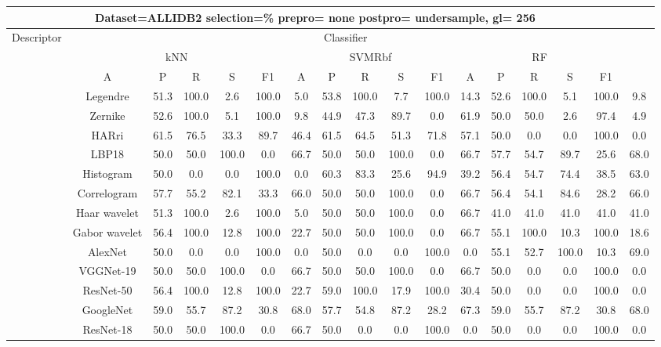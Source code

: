 \documentclass[12pt,italian]{article}
\begin{document}
\begin{tiny}
\begin{longtable}{lcccccccccccccccc}
\toprule
\multicolumn{16}{c}{Dataset=ALLIDB2 selection=\% prepro= none postpro= undersample, gl= 256} \\ 
\toprule
Descriptor & \multicolumn{15}{c}{Classifier} \\ 
& \multicolumn{5}{c}{kNN} & \multicolumn{5}{c}{SVMRbf} & \multicolumn{5}{c}{RF} \\ 
& A & P & R & S & F1 & A & P & R & S & F1 & A & P & R & S & F1 \\ 
\midrule
& Legendre & 51.3 & 100.0 &  2.6 & 100.0 &  5.0 & 53.8 & 100.0 &  7.7 & 100.0 & 14.3 & 52.6 & 100.0 &  5.1 & 100.0 &  9.8 \\ 
& Zernike & 52.6 & 100.0 &  5.1 & 100.0 &  9.8 & 44.9 & 47.3 & 89.7 &  0.0 & 61.9 & 50.0 & 50.0 &  2.6 & 97.4 &  4.9 \\ 
& HARri & 61.5 & 76.5 & 33.3 & 89.7 & 46.4 & 61.5 & 64.5 & 51.3 & 71.8 & 57.1 & 50.0 &  0.0 &  0.0 & 100.0 &  0.0 \\ 
& LBP18 & 50.0 & 50.0 & 100.0 &  0.0 & 66.7 & 50.0 & 50.0 & 100.0 &  0.0 & 66.7 & 57.7 & 54.7 & 89.7 & 25.6 & 68.0 \\ 
& Histogram & 50.0 &  0.0 &  0.0 & 100.0 &  0.0 & 60.3 & 83.3 & 25.6 & 94.9 & 39.2 & 56.4 & 54.7 & 74.4 & 38.5 & 63.0 \\ 
& Correlogram & 57.7 & 55.2 & 82.1 & 33.3 & 66.0 & 50.0 & 50.0 & 100.0 &  0.0 & 66.7 & 56.4 & 54.1 & 84.6 & 28.2 & 66.0 \\ 
& Haar wavelet & 51.3 & 100.0 &  2.6 & 100.0 &  5.0 & 50.0 & 50.0 & 100.0 &  0.0 & 66.7 & 41.0 & 41.0 & 41.0 & 41.0 & 41.0 \\ 
& Gabor wavelet & 56.4 & 100.0 & 12.8 & 100.0 & 22.7 & 50.0 & 50.0 & 100.0 &  0.0 & 66.7 & 55.1 & 100.0 & 10.3 & 100.0 & 18.6 \\ 
& AlexNet & 50.0 &  0.0 &  0.0 & 100.0 &  0.0 & 50.0 &  0.0 &  0.0 & 100.0 &  0.0 & 55.1 & 52.7 & 100.0 & 10.3 & 69.0 \\ 
& VGGNet-19 & 50.0 & 50.0 & 100.0 &  0.0 & 66.7 & 50.0 & 50.0 & 100.0 &  0.0 & 66.7 & 50.0 &  0.0 &  0.0 & 100.0 &  0.0 \\ 
& ResNet-50 & 56.4 & 100.0 & 12.8 & 100.0 & 22.7 & 59.0 & 100.0 & 17.9 & 100.0 & 30.4 & 50.0 &  0.0 &  0.0 & 100.0 &  0.0 \\ 
& GoogleNet & 59.0 & 55.7 & 87.2 & 30.8 & 68.0 & 57.7 & 54.8 & 87.2 & 28.2 & 67.3 & 59.0 & 55.7 & 87.2 & 30.8 & 68.0 \\ 
& ResNet-18 & 50.0 & 50.0 & 100.0 &  0.0 & 66.7 & 50.0 &  0.0 &  0.0 & 100.0 &  0.0 & 50.0 &  0.0 &  0.0 & 100.0 &  0.0 \\ 

\end{longtable}
\end{tiny}
\end{document}
